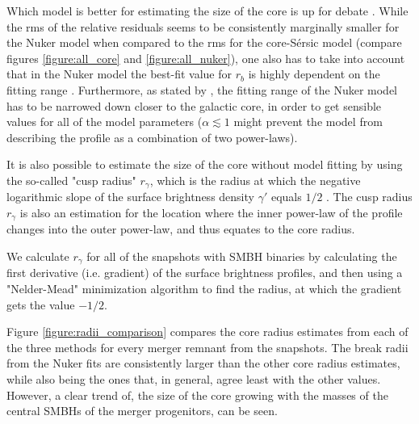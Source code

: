 \documentclass[english, oneside]{HYgradu}
\begin{document}
Which model is better for estimating the size of the core is up for debate \cite{Lauer2007, Dullo2012}. While the rms of the relative residuals seems to be consistently marginally smaller for the Nuker model when compared to the rms for the core-Sérsic model (compare figures \ref{figure:all_core} and \ref{figure:all_nuker}), one also has to take into account that in the Nuker model the best-fit value for $r_b$ is highly dependent on the fitting range \citep{Graham2003Nuker}. Furthermore, as stated by \cite{Rantala2018}, the fitting range of the Nuker model has to be narrowed down closer to the galactic core, in order to get sensible values for all of the model parameters ($\alpha \lesssim 1$ might prevent the model from describing the profile as a combination of two power-laws).

It is also possible to estimate the size of the core without model fitting by using the so-called "cusp radius" $r_\gamma$, which is the radius at which the negative logarithmic slope of the surface brightness density $\gamma'$ equals $1/2$ \citep{Carollo1997, Lauer2007Cusp}. The cusp radius $r_\gamma$ is also an estimation for the location where the inner power-law of the profile changes into the outer power-law, and thus equates to the core radius. 

We calculate $r_\gamma$ for all of the snapshots with SMBH binaries by calculating the first derivative (i.e. gradient) of the surface brightness profiles, and then using a "Nelder-Mead" minimization algorithm to find the radius, at which the gradient gets the value $-1/2$. 

Figure \ref{figure:radii_comparison} compares the core radius estimates from each of the three methods for every merger remnant from the snapshots. The break radii from the Nuker fits are consistently larger than the other core radius estimates, while also being the ones that, in general, agree least with the other values. However, a clear trend of, the size of the core growing with the masses of the central SMBHs of the merger progenitors, can be seen.
\end{document}
